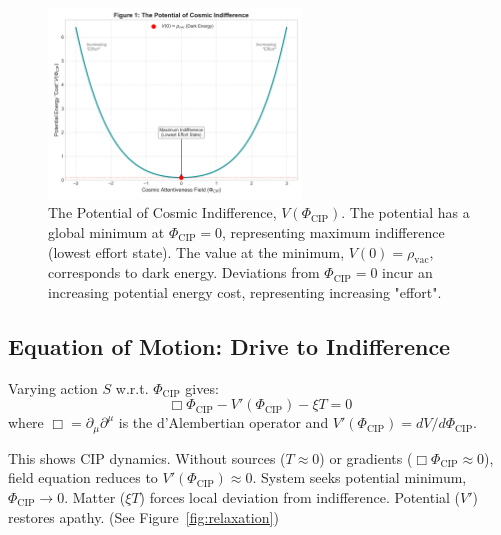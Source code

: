 \documentclass[11pt, a4paper]{article}
\newcommand{\subt}[1]{\mathrm{#1}}
\begin{document}
\begin{figure}[H] %
    \centering
    \includegraphics[width=0.6\textwidth]{CIP_Potential.png}
    \caption[The Potential of Cosmic Indifference]{The Potential of Cosmic Indifference, $V(\Phi_{\subt{CIP}})$. The potential has a global minimum at $\Phi_{\subt{CIP}} = 0$, representing maximum indifference (lowest effort state). The value at the minimum, $V(0) = \rho_{\subt{vac}}$, corresponds to dark energy. Deviations from $\Phi_{\subt{CIP}} = 0$ incur an increasing potential energy cost, representing increasing "effort".}
    \label{fig:potential}
\end{figure}

\subsection{Equation of Motion: Drive to Indifference}

Varying action $S$ w.r.t. $\Phi_{\subt{CIP}}$ gives:
\begin{equation} \label{eq:eom_cip}
\Box\Phi_{\subt{CIP}} - V'(\Phi_{\subt{CIP}}) - \xi T = 0
\end{equation}
where $\Box = \partial_{\mu}\partial^{\mu}$ is the d'Alembertian operator and $V'(\Phi_{\subt{CIP}}) = dV/d\Phi_{\subt{CIP}}$.

This shows CIP dynamics. Without sources ($T \approx 0$) or gradients ($\Box\Phi_{\subt{CIP}} \approx 0$), field equation reduces to $V'(\Phi_{\subt{CIP}}) \approx 0$. System seeks potential minimum, $\Phi_{\subt{CIP}} \to 0$. Matter ($\xi T$) forces local deviation from indifference. Potential ($V'$) restores apathy. (See Figure~\ref{fig:relaxation})
\end{document}

